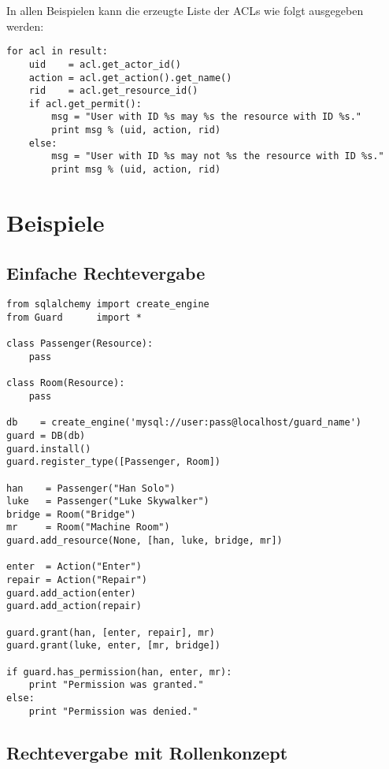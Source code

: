 In allen Beispielen kann die erzeugte Liste der ACLs wie folgt ausgegeben 
werden:

\begin{lstlisting}
for acl in result:
    uid    = acl.get_actor_id()
    action = acl.get_action().get_name()
    rid    = acl.get_resource_id()
    if acl.get_permit():
        msg = "User with ID %s may %s the resource with ID %s."
        print msg % (uid, action, rid)
    else:
        msg = "User with ID %s may not %s the resource with ID %s."
        print msg % (uid, action, rid)
\end{lstlisting}


\newpage
\section{Beispiele}
\subsection{Einfache Rechtevergabe}

\begin{lstlisting}
from sqlalchemy import create_engine
from Guard      import *

class Passenger(Resource):
    pass

class Room(Resource):
    pass

db    = create_engine('mysql://user:pass@localhost/guard_name')
guard = DB(db)
guard.install()
guard.register_type([Passenger, Room])

han    = Passenger("Han Solo")
luke   = Passenger("Luke Skywalker")
bridge = Room("Bridge")
mr     = Room("Machine Room")
guard.add_resource(None, [han, luke, bridge, mr])

enter  = Action("Enter")
repair = Action("Repair")
guard.add_action(enter)
guard.add_action(repair)

guard.grant(han, [enter, repair], mr)
guard.grant(luke, enter, [mr, bridge])

if guard.has_permission(han, enter, mr):
    print "Permission was granted."
else:
    print "Permission was denied."
\end{lstlisting}


\subsection{Rechtevergabe mit Rollenkonzept}


